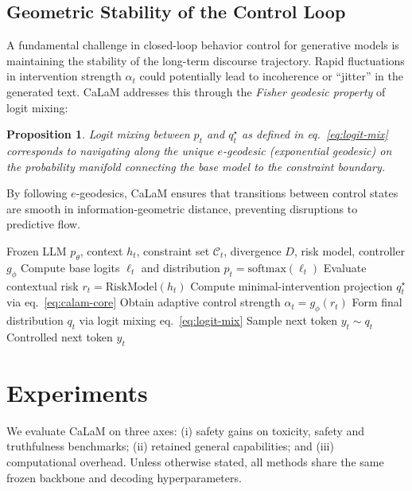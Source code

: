 \documentclass{article}
\theoremstyle{plain}
\newtheorem{proposition}[theorem]{Proposition}
\theoremstyle{definition}
\theoremstyle{remark}
\begin{document}
\subsection{Geometric Stability of the Control Loop}
\label{sec:controller-stability}

A fundamental challenge in closed-loop behavior control for generative models is maintaining the stability of the long-term discourse trajectory. Rapid fluctuations in intervention strength $\alpha_t$ could potentially lead to incoherence or ``jitter'' in the generated text. CaLaM addresses this through the \emph{Fisher geodesic property} of logit mixing:
\begin{proposition}
\label{prop:stability}
Logit mixing between $p_t$ and $q_t^\star$ as defined in eq.~\eqref{eq:logit-mix} corresponds to navigating along the unique \emph{$e$-geodesic} (exponential geodesic) on the probability manifold connecting the base model to the constraint boundary.
\end{proposition}
By following $e$-geodesics, CaLaM ensures that transitions between control states are smooth in information-geometric distance, preventing disruptions to predictive flow.

\begin{algorithm}[t]
  \caption{CaLaM Autopilot Decoding (Single Step)}
  \label{alg:calam-step}
  \begin{algorithmic}[1]
    \REQUIRE Frozen LLM $p_\theta$, context $h_t$, constraint set $\mathcal{C}_t$, divergence $D$, risk model, controller $g_\phi$
    \STATE Compute base logits $\ell_t$ and distribution $p_t = \mathrm{softmax}(\ell_t)$
    \STATE Evaluate contextual risk $r_t = \mathrm{RiskModel}(h_t)$
    \STATE Compute minimal-intervention projection $q_t^\star$ via eq.~\eqref{eq:calam-core}
    \STATE Obtain adaptive control strength $\alpha_t = g_\phi(r_t)$
    \STATE Form final distribution $q_t$ via logit mixing eq.~\eqref{eq:logit-mix}
    \STATE Sample next token $y_t \sim q_t$
    \ENSURE Controlled next token $y_t$
  \end{algorithmic}
\end{algorithm}


\section{Experiments}
\label{sec:experiments}

We evaluate CaLaM on three axes:
(i) safety gains on toxicity, safety and truthfulness benchmarks;
(ii) retained general capabilities; and
(iii) computational overhead.
Unless otherwise stated, all methods share the same frozen backbone and decoding hyperparameters.
\end{document}
